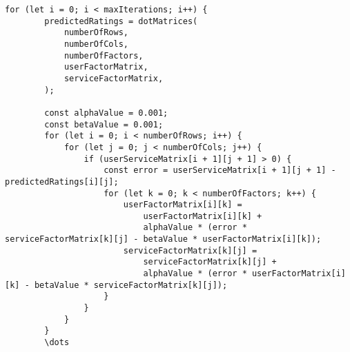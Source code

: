 \begin{lstlisting}[caption={}, captionpos=b, label={}]
    for (let i = 0; i < maxIterations; i++) {
        predictedRatings = dotMatrices(
            numberOfRows,
            numberOfCols,
            numberOfFactors,
            userFactorMatrix,
            serviceFactorMatrix,
        );

        const alphaValue = 0.001;
        const betaValue = 0.001;
        for (let i = 0; i < numberOfRows; i++) {
            for (let j = 0; j < numberOfCols; j++) {
                if (userServiceMatrix[i + 1][j + 1] > 0) {
                    const error = userServiceMatrix[i + 1][j + 1] - predictedRatings[i][j];
                    for (let k = 0; k < numberOfFactors; k++) {
                        userFactorMatrix[i][k] =
                            userFactorMatrix[i][k] +
                            alphaValue * (error * serviceFactorMatrix[k][j] - betaValue * userFactorMatrix[i][k]);
                        serviceFactorMatrix[k][j] =
                            serviceFactorMatrix[k][j] +
                            alphaValue * (error * userFactorMatrix[i][k] - betaValue * serviceFactorMatrix[k][j]);
                    }
                }
            }
        }
        \dots
\end{lstlisting}
\begin{lstlisting}[caption={}, captionpos=b, label={}]

\end{lstlisting}
\begin{lstlisting}[caption={}, captionpos=b, label={}]

\end{lstlisting}
\begin{lstlisting}[caption={}, captionpos=b, label={}]

\end{lstlisting}
\begin{lstlisting}[caption={}, captionpos=b, label={}]

\end{lstlisting}
\begin{lstlisting}[caption={}, captionpos=b, label={}]

\end{lstlisting}
\begin{lstlisting}[caption={}, captionpos=b, label={}]

\end{lstlisting}
\begin{lstlisting}[caption={}, captionpos=b, label={}]

\end{lstlisting}